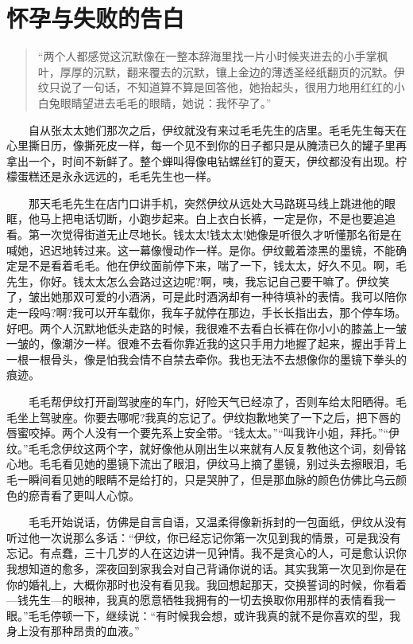 \documentclass[12pt,UTF8]{ctexbook}
\begin{document}
\hypertarget{ux6000ux5b55ux4e0eux5931ux8d25ux7684ux544aux767d}{%
\section*{怀孕与失败的告白}\label{ux6000ux5b55ux4e0eux5931ux8d25ux7684ux544aux767d}}

\begin{quote}
\enquote{两个人都感觉这沉默像在一整本辞海里找一片小时候夹进去的小手掌枫叶，厚厚的沉默，翻来覆去的沉默，镶上金边的薄透圣经纸翻页的沉默。伊纹只说了一句话，不知道算不算是回答他，她抬起头，很用力地用红红的小白兔眼睛望进去毛毛的眼睛，她说：我怀孕了。}
\end{quote}

　　自从张太太她们那次之后，伊纹就没有来过毛毛先生的店里。毛毛先生每天在心里撕日历，像撕死皮一样，每一个见不到你的日子都只是从腌渍已久的罐子里再拿出一个，时间不新鲜了。整个蝉叫得像电钻螺丝钉的夏天，伊纹都没有出现。柠檬蛋糕还是永永远远的，毛毛先生也一样。

　　那天毛毛先生在店门口讲手机，突然伊纹从远处大马路斑马线上跳进他的眼眶，他马上把电话切断，小跑步起来。白上衣白长裤，一定是你，不是也要追追看。第一次觉得街道无止尽地长。钱太太!钱太太!她像是听很久才听懂那名衔是在喊她，迟迟地转过来。这一幕像慢动作一样。是你。伊纹戴着漆黑的墨镜，不能确定是不是看着毛毛。他在伊纹面前停下来，喘了一下，钱太太，好久不见。啊，毛先生，你好。钱太太怎么会路过这边呢?啊，咦，我忘记自己要干嘛了。伊纹笑了，皱出她那双可爱的小酒涡，可是此时酒涡却有一种待填补的表情。我可以陪你走一段吗?啊?我可以开车载你，我车子就停在那边，手长长指出去，那个停车场。好吧。两个人沉默地低头走路的时候，我很难不去看白长裤在你小小的膝盖上一皱一皱的，像潮汐一样。很难不去看你靠近我的这只手用力地握了起来，握出手背上一根一根骨头，像是怕我会情不自禁去牵你。我也无法不去想像你的墨镜下拳头的痕迹。

　　毛毛帮伊纹打开副驾驶座的车门，好险天气已经凉了，否则车给太阳晒得。毛毛坐上驾驶座。你要去哪呢?我真的忘记了。伊纹抱歉地笑了一下之后，把下唇的唇蜜咬掉。两个人没有一个要先系上安全带。\enquote{钱太太。}\enquote{叫我许小姐，拜托。}\enquote{伊纹。}毛毛念伊纹这两个字，就好像他从刚出生以来就有人反复教他这个词，刻骨铭心地。毛毛看见她的墨镜下流出了眼泪，伊纹马上摘了墨镜，别过头去擦眼泪，毛毛一瞬间看见她的眼睛不是给打的，只是哭肿了，但是那血脉的颜色仿佛比乌云颜色的瘀青看了更叫人心惊。

　　毛毛开始说话，仿佛是自言自语，又温柔得像新拆封的一包面纸，伊纹从没有听过他一次说那么多话：\enquote{伊纹，你已经忘记你第一次见到我的情景，可是我没有忘记。有点蠢，三十几岁的人在这边讲一见钟情。我不是贪心的人，可是愈认识你我想知道的愈多，深夜回到家我会对自己背诵你说的话。其实我第一次见到你是在你的婚礼上，大概你那时也没有看见我。我回想起那天，交换誓词的时候，你看着---钱先生---的眼神，我真的愿意牺牲我拥有的一切去换取你用那样的表情看我一眼。}毛毛停顿一下，继续说：\enquote{有时候我会想，或许我真的就不是你喜欢的型，我身上没有那种昂贵的血液。}
\end{document}
